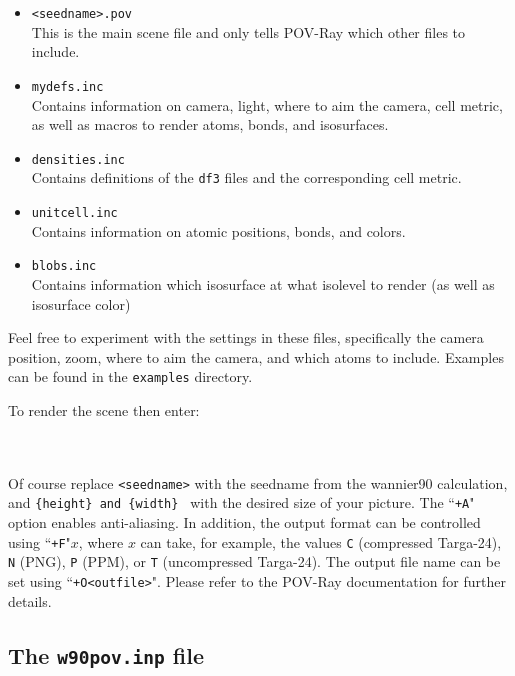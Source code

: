 \documentclass[
  notitlepage,
  twoside,
   prb,
  floatfix,
]{revtex4-1}
\begin{document}
\begin{itemize}
\item {\tt<seedname>.pov} \\
This is the main scene file and only tells \textsf{POV-Ray} which other files to include.
\item {\tt mydefs.inc} \\
Contains information on camera, light, where to aim the camera, cell metric, as well as macros to render atoms, bonds, and isosurfaces.
\item {\tt densities.inc} \\
Contains definitions of the {\tt df3} files and the corresponding cell metric.
\item{\tt unitcell.inc} \\
Contains information on atomic positions, bonds, and colors.
\item{\tt blobs.inc} \\
Contains information which isosurface at what isolevel to render (as well as isosurface color)
\end{itemize}

Feel free to experiment with the settings in these files, specifically the camera position, zoom, where to aim the camera, and which atoms to include. Examples can be found in the {\tt examples} directory.

To render the scene then enter:

\mbox{}\\
\mbox{}\\

Of course replace {\tt <seedname>} with the seedname from the \textsf{wannier90} calculation, and {\tt \{height\} and \{width\} } with the desired size of your picture. The ``{\tt +A}" option enables anti-aliasing. In addition, the output format can be controlled using ``{\tt +F}"$x$, where $x$ can take, for example, the values {\tt C} (compressed Targa-24), {\tt N} (PNG), {\tt P} (PPM), or {\tt T} (uncompressed Targa-24). The output file name can be set using ``{\tt +O<outfile>}". Please refer to the \textsf{POV-Ray} documentation for further details.


\subsection*{The {\tt w90pov.inp} file}
\end{document}

